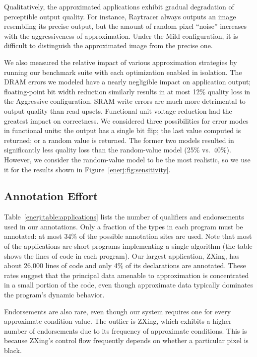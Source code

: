 Qualitatively, the approximated applications exhibit gradual degradation of
perceptible output quality. For instance, Raytracer always outputs an image
resembling its precise output, but the amount of random pixel ``noise''
increases with the aggressiveness of approximation. Under the Mild
configuration, it is difficult to distinguish the approximated image from the
precise one.

We also measured the relative impact of various approximation
strategies by running our benchmark suite with each optimization enabled in
isolation. The DRAM errors we modeled have a nearly negligible impact on application output;
floating-point bit width reduction similarly results in at most 12\% quality loss
in the Aggressive configuration. SRAM write errors are much more detrimental to
output quality than read upsets. Functional unit voltage reduction had the
greatest impact on correctness. We considered three possibilities for error
modes in
functional units: the output has a single bit flip; the last value computed is
returned; or a random value is returned. The former two models resulted in
significantly less quality loss than the random-value model (25\% vs.~40\%).
However, we consider the random-value model to be the most realistic, so we use it for
the results shown in Figure~\ref{enerj:fig:sensitivity}.

\subsection{Annotation Effort}
\label{enerj:effort}
Table~\ref{enerj:table:applications} lists the number of qualifiers and
endorsements used in our annotations.
Only a fraction of the types in each program must be annotated: at most 34\% of
the possible annotation sites are used.
Note that most of the applications are short programs implementing a
single algorithm (the table shows the lines of code in
each program). Our largest application, ZXing, has about 26,000 lines
of code and only 4\% of its declarations are annotated.
These rates suggest that the principal data
amenable to approximation is concentrated in a small portion of the code,
even though approximate data typically dominates the program's dynamic behavior.

Endorsements are also rare, even though our system requires one for every
approximate condition value. The outlier is ZXing, which exhibits a higher
number of endorsements due to its frequency of approximate conditions. This is
because ZXing's control flow
frequently depends on whether a particular pixel is black.

